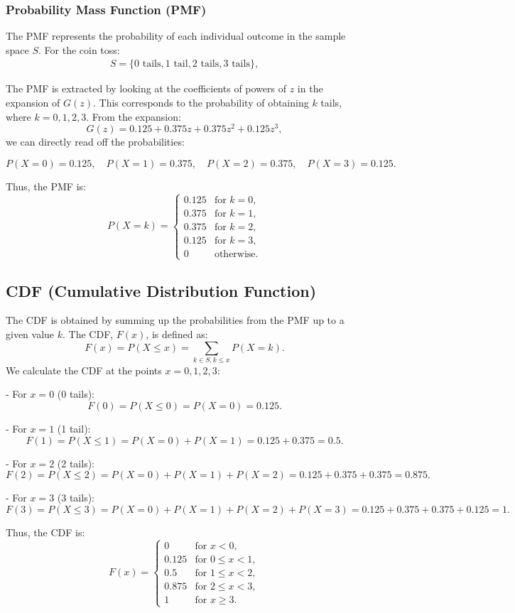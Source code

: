 \documentclass[journal]{IEEEtran}
\begin{document}
\subsubsection*{Probability Mass Function (PMF)}
The PMF represents the probability of each individual outcome in the sample space \( S \). For the coin toss:
\begin{align}
S = \{0 \text{ tails}, 1 \text{ tail}, 2 \text{ tails}, 3 \text{ tails}\},
\end{align}

The PMF is extracted by looking at the coefficients of powers of \( z \) in the expansion of \( G(z) \). This corresponds to the probability of obtaining \( k \) tails, where \( k = 0, 1, 2, 3 \). From the expansion:
\[
G(z) = 0.125 + 0.375z + 0.375z^2 + 0.125z^3,
\]
we can directly read off the probabilities:

\[
P(X = 0) = 0.125, \quad P(X = 1) = 0.375, \quad P(X = 2) = 0.375, \quad P(X = 3) = 0.125.
\]

Thus, the PMF is:
\[
P(X = k) = \begin{cases}
0.125 & \text{for } k = 0, \\
0.375 & \text{for } k = 1, \\
0.375 & \text{for } k = 2, \\
0.125 & \text{for } k = 3, \\
0 & \text{otherwise}.
\end{cases}
\]
\subsection*{CDF (Cumulative Distribution Function)}
The CDF is obtained by summing up the probabilities from the PMF up to a given value \( k \). The CDF, \( F(x) \), is defined as:
\[
F(x) = P(X \leq x) = \sum_{k \in S, k \leq x} P(X = k).
\]
We calculate the CDF at the points \( x = 0, 1, 2, 3 \):

- For \( x = 0 \) (0 tails):
\[
F(0) = P(X \leq 0) = P(X = 0) = 0.125.
\]

- For \( x = 1 \) (1 tail):
\[
F(1) = P(X \leq 1) = P(X = 0) + P(X = 1) = 0.125 + 0.375 = 0.5.
\]

- For \( x = 2 \) (2 tails):
\[
F(2) = P(X \leq 2) = P(X = 0) + P(X = 1) + P(X = 2) = 0.125 + 0.375 + 0.375 = 0.875.
\]

- For \( x = 3 \) (3 tails):
\[
F(3) = P(X \leq 3) = P(X = 0) + P(X = 1) + P(X = 2) + P(X = 3) = 0.125 + 0.375 + 0.375 + 0.125 = 1.
\]

Thus, the CDF is:
\[
F(x) = \begin{cases}
0 & \text{for } x < 0, \\
0.125 & \text{for } 0 \leq x < 1, \\
0.5 & \text{for } 1 \leq x < 2, \\
0.875 & \text{for } 2 \leq x < 3, \\
1 & \text{for } x \geq 3.
\end{cases}
\]
\end{document}
